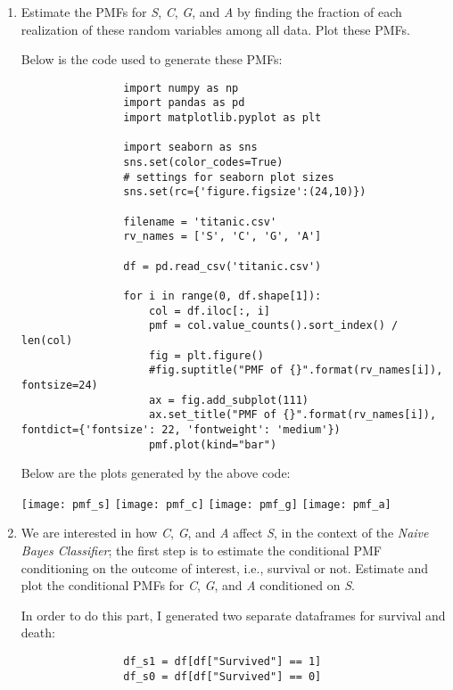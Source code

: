 \documentclass[]{article}
\begin{document}
\begin{enumerate}
    	\begin{enumerate}
    		\item Estimate the PMFs for \textit{S}, \textit{C}, \textit{G}, and \textit{A} by finding the fraction of each realization of these random variables among all data. Plot these PMFs.
    		
    		Below is the code used to generate these PMFs:
    		
    		\begin{lstlisting}
    			import numpy as np
    			import pandas as pd
    			import matplotlib.pyplot as plt
    			
    			import seaborn as sns
    			sns.set(color_codes=True)
    			# settings for seaborn plot sizes
    			sns.set(rc={'figure.figsize':(24,10)})
    			
    			filename = 'titanic.csv'
    			rv_names = ['S', 'C', 'G', 'A']
    			
    			df = pd.read_csv('titanic.csv')
    			
    			for i in range(0, df.shape[1]):
    				col = df.iloc[:, i]
    				pmf = col.value_counts().sort_index() / len(col)
	    			fig = plt.figure()
    				#fig.suptitle("PMF of {}".format(rv_names[i]), fontsize=24)
    				ax = fig.add_subplot(111)
    				ax.set_title("PMF of {}".format(rv_names[i]), fontdict={'fontsize': 22, 'fontweight': 'medium'})
    				pmf.plot(kind="bar")
    		\end{lstlisting}
    	
    		Below are the plots generated by the above code:
    		
    		\texttt{[image: pmf\_s]}
    		\texttt{[image: pmf\_c]}
    		\texttt{[image: pmf\_g]}
    		\texttt{[image: pmf\_a]}
    		
    		
    		
    		\item We are interested in how \textit{C}, \textit{G}, and \textit{A} affect \textit{S}, in the context of the \textit{Naive  Bayes  Classifier}; the first step is to estimate the conditional PMF conditioning on the outcome of interest, i.e., survival or not.  Estimate and plot the conditional PMFs for \textit{C}, \textit{G}, and \textit{A} conditioned on \textit{S}.
    		
    		In order to do this part, I generated two separate dataframes for survival and death:
    		
    		\begin{lstlisting}
    			df_s1 = df[df["Survived"] == 1]
    			df_s0 = df[df["Survived"] == 0]
    		\end{lstlisting}
    	

\end{enumerate}
\end{enumerate}
\end{document}
